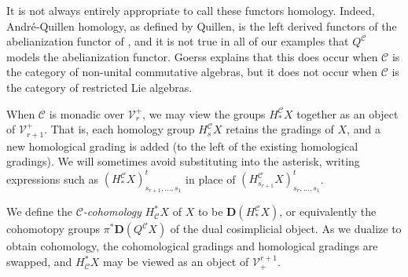 \documentclass[11pt]{amsart}
\theoremstyle{plain}
\theoremstyle{definition}
\newcommand{\calV}{\mathcal{V}}
\newcommand{\calc}{\mathcal{C}}
\theoremstyle{plain}
\newcommand{\vect}[2]{\calV^{#1}_{#2}}
\newcommand{\dual}{\mathbf{D}}
\begin{document}
\begin{Conventions and notation}
It is not always entirely appropriate to call these functors homology. Indeed, Andr\'e-Quillen homology, as defined by Quillen, is the left derived functors of the abelianization functor of \cite[\S II.5]{QuillenHomAlg.pdf}, and it is not true in all of our examples that $Q^\calc$ models the abelianization functor. Goerss \cite[\S4]{MR1089001} explains that this does occur when $\calc$ is the category of non-unital commutative algebras, but it does not occur when $\calc$ is the category of restricted Lie algebras.

When $\calc$ is monadic over $\vect{+}{r}$, we may view the groups $H_*^{\calc}X$ together as an object of $\vect{+}{r+1}$. That is, each homology group $H_s^\calc X$ retains the gradings of $X$, and a new homological grading is added (to the left of the existing homological gradings). We will sometimes avoid substituting into the asterisk, writing expressions such as $(H_*^\calc X)_{s_{r+1},\ldots,s_1}^t$ in place of $(H_{s_{r+1}}^\calc X)_{s_r,\ldots,s_1}^t$.

We define the \emph{$\calc$-cohomology} $H^*_\calc X$ of $X$ to be $\dual(H_*^\calc X)$, or equivalently the cohomotopy groups $\pi^*\dual(Q^\calc X)$ of the dual cosimplicial object.  As we dualize to obtain cohomology, the cohomological gradings and homological gradings are swapped, and $H^*_{\calc}X$ may be viewed as an object of $\vect{r+1}{+}$. 



\end{Conventions and notation}
\end{document}
